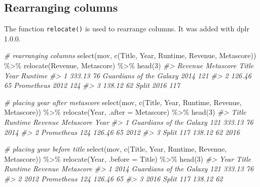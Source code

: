 \documentclass[
]{book}
\newenvironment{Shaded}{\begin{snugshade}}{\end{snugshade}}
\newcommand{\AttributeTok}[1]{\textcolor[rgb]{0.77,0.63,0.00}{#1}}
\newcommand{\CommentTok}[1]{\textcolor[rgb]{0.56,0.35,0.01}{\textit{#1}}}
\newcommand{\DecValTok}[1]{\textcolor[rgb]{0.00,0.00,0.81}{#1}}
\newcommand{\FunctionTok}[1]{\textcolor[rgb]{0.00,0.00,0.00}{#1}}
\newcommand{\NormalTok}[1]{#1}
\newcommand{\SpecialCharTok}[1]{\textcolor[rgb]{0.00,0.00,0.00}{#1}}
\begin{document}
\hypertarget{rearranging-columns}{%
\subsection{Rearranging columns}\label{rearranging-columns}}

The function \texttt{relocate()} is used to rearrange columns. It was added with dplr 1.0.0.

\begin{Shaded}
\begin{Highlighting}[]
\CommentTok{\# rearranging columns}
\FunctionTok{select}\NormalTok{(mov, }\FunctionTok{c}\NormalTok{(Title, Year, Runtime, Revenue, Metascore)) }\SpecialCharTok{\%\textgreater{}\%}
  \FunctionTok{relocate}\NormalTok{(Revenue, Metascore) }\SpecialCharTok{\%\textgreater{}\%}
  \FunctionTok{head}\NormalTok{(}\DecValTok{3}\NormalTok{)}
\CommentTok{\#\textgreater{}   Revenue Metascore                   Title Year Runtime}
\CommentTok{\#\textgreater{} 1  333.13        76 Guardians of the Galaxy 2014     121}
\CommentTok{\#\textgreater{} 2  126.46        65              Prometheus 2012     124}
\CommentTok{\#\textgreater{} 3  138.12        62                   Split 2016     117}

\CommentTok{\# placing year after metascore}
\FunctionTok{select}\NormalTok{(mov, }\FunctionTok{c}\NormalTok{(Title, Year, Runtime, Revenue, Metascore)) }\SpecialCharTok{\%\textgreater{}\%}
  \FunctionTok{relocate}\NormalTok{(Year, }\AttributeTok{.after =}\NormalTok{ Metascore) }\SpecialCharTok{\%\textgreater{}\%}
  \FunctionTok{head}\NormalTok{(}\DecValTok{3}\NormalTok{)}
\CommentTok{\#\textgreater{}                     Title Runtime Revenue Metascore Year}
\CommentTok{\#\textgreater{} 1 Guardians of the Galaxy     121  333.13        76 2014}
\CommentTok{\#\textgreater{} 2              Prometheus     124  126.46        65 2012}
\CommentTok{\#\textgreater{} 3                   Split     117  138.12        62 2016}

\CommentTok{\# placing year before title}
\FunctionTok{select}\NormalTok{(mov, }\FunctionTok{c}\NormalTok{(Title, Year, Runtime, Revenue, Metascore)) }\SpecialCharTok{\%\textgreater{}\%}
  \FunctionTok{relocate}\NormalTok{(Year, }\AttributeTok{.before =}\NormalTok{ Title) }\SpecialCharTok{\%\textgreater{}\%}
  \FunctionTok{head}\NormalTok{(}\DecValTok{3}\NormalTok{)}
\CommentTok{\#\textgreater{}   Year                   Title Runtime Revenue Metascore}
\CommentTok{\#\textgreater{} 1 2014 Guardians of the Galaxy     121  333.13        76}
\CommentTok{\#\textgreater{} 2 2012              Prometheus     124  126.46        65}
\CommentTok{\#\textgreater{} 3 2016                   Split     117  138.12        62}


\end{Highlighting}
\end{Shaded}
\end{document}
